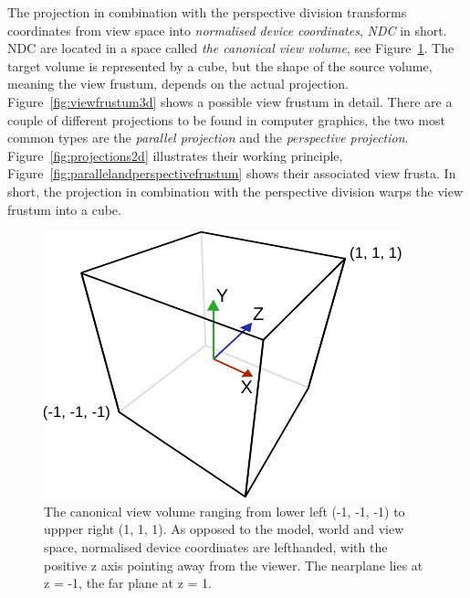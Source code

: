 The projection in combination with the perspective division transforms
coordinates from view space into \textit{normalised device coordinates},
\textit{NDC} in short. NDC are located in a space called \textit{the canonical
view volume}, see Figure~\ref{fig:canonicalviewvolume}. The target volume is
represented by a cube, but the shape of the source volume, meaning the view
frustum, depends on the actual projection. Figure~\ref{fig:viewfrustum3d} shows
a possible view frustum in detail. There are a couple of different projections
to be found in computer graphics, the two most common types are the
\textit{parallel projection} and the \textit{perspective projection}.
Figure~\ref{fig:projections2d} illustrates their working principle,
Figure~\ref{fig:parallelandperspectivefrustum} shows their associated view
frusta. In short, the projection in combination with the perspective division
warps the view frustum into a cube.
\begin{figure}
\begin{center}
\includegraphics[scale=0.8]{Images/CanonicalCube.pdf}
\caption[The canonical view volume]{The canonical view volume ranging from lower
left (-1, -1, -1) to uppper right (1, 1, 1). As opposed to the model, world and
view space, normalised device coordinates are lefthanded, with the positive z
axis pointing away from the viewer. The nearplane lies at z = -1, the far plane
at z = 1.}
\label{fig:canonicalviewvolume}
\end{center}
\end{figure}
